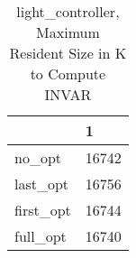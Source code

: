 \begin{table}
\caption{light\_controller, Maximum Resident Size in K to Compute INVAR}
\label{light_controller_INVAR_size}
\begin{tabular}{ll}
\toprule
 & 1 \\
\midrule
no\_opt & 16742 \\
last\_opt & 16756 \\
first\_opt & 16744 \\
full\_opt & 16740 \\
\bottomrule
\end{tabular}
\end{table}
